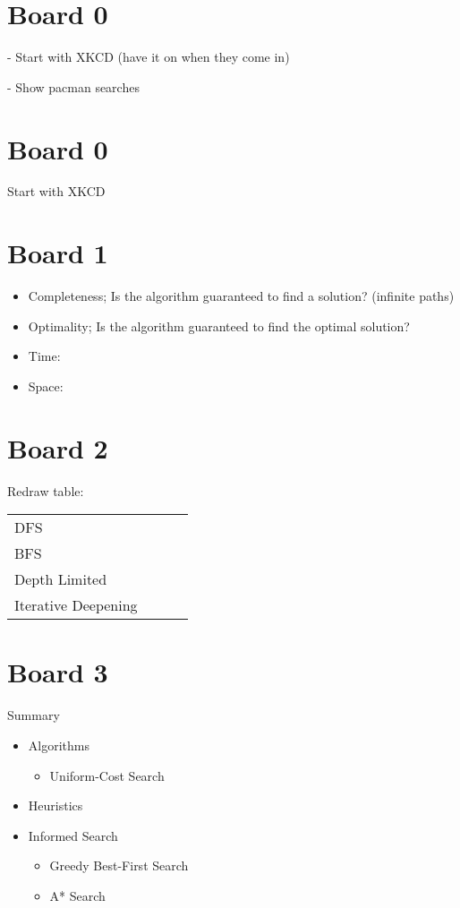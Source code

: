 \documentclass[10pt]{article}
\begin{document}
\MakeScribeTop{}

\section{Board 0}

- Start with XKCD (have it on when they come in)

- Show pacman searches

\section{Board 0}

Start with XKCD


\section{Board 1}
\begin{itemize}
\item Completeness; Is the algorithm guaranteed to find a solution? (infinite paths)
\item Optimality; Is the algorithm guaranteed to find the optimal solution?
\item Time:
\item Space:
\end{itemize}

\section{Board 2}

Redraw table:

\begin{table}
  \centering
  \begin{tabular}{llll}
    
    DFS &  \\
    BFS &  \\
    Depth Limited &  \\
    Iterative Deepening & \\
  \end{tabular}
\end{table}

\section{Board 3}

Summary

\begin{itemize}
\item Algorithms
\begin{itemize}
\item Uniform-Cost Search 
\end{itemize}
\item Heuristics
\item Informed Search
  \begin{itemize}
  \item Greedy Best-First Search 
  \item A* Search
  \end{itemize}
\end{itemize}
\end{document}
